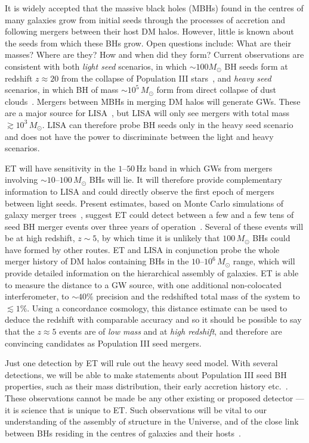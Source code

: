 It is widely accepted that the massive black holes (MBHs) found in the centres of many galaxies grow from initial seeds through the processes of accretion and following mergers between their host DM halos. However, little is known about the seeds from which these BHs grow. Open questions include: What are their masses? Where are they? How and when did they form? Current observations are consistent with both \emph{light seed} scenarios, in which $\sim100M_{\odot}$ BH seeds form at redshift $z \approx 20$ from the collapse of Population III stars~\cite{svh,madau01}, and \emph{heavy seed} scenarios, in which BH of mass $\sim10^5\,M_{\odot}$ form from direct collapse of dust clouds~\cite{KBD,BVR}. Mergers between MBHs in merging DM halos will generate GWs. These are a major source for LISA~\cite{PPA}, but LISA will only see mergers with total mass $\gtrsim 10^3\,M_{\odot}$. LISA can therefore probe BH seeds only in the heavy seed scenario and does not have the power to discriminate between the light and heavy scenarios.

ET will have sensitivity in the $1$--$50$\,Hz band
in which GWs from mergers involving
$\sim10$--$100\,M_{\odot}$ BHs will lie. It will therefore
provide complementary information to LISA and could directly observe
the first epoch of mergers between light seeds. Present estimates,
based on Monte Carlo simulations of galaxy merger
trees~\cite{vhm,vsh}, suggest ET could detect
between a few and a few tens of seed BH merger events over
three years of operation~\cite{sgmv09a}. Several of these events will
be at high redshift, $z\sim5$, by which time it is unlikely that
$100\,M_{\odot}$ BHs could have formed by other routes. ET and
LISA in conjunction probe the whole merger history of DM
halos containing BHs in the $10$--$10^6\,M_{\odot}$ range, which
will provide detailed information on the hierarchical assembly of
galaxies. ET is able to measure the distance to a GW source, with 
one additional non-colocated interferometer, to $\sim40\%$ precision 
and the redshifted total mass of the system to $\lesssim 1\%$.
Using a concordance cosmology, this distance estimate can be used 
to deduce the redshift with comparable accuracy and so it should be 
possible to say that the $z \approx 5$ events are of \emph{low mass} 
and at \emph{high redshift}, and therefore are convincing candidates 
as Population III seed mergers.

Just one detection by ET will rule out the heavy seed model. With several detections, we will be able to make statements about Population III seed BH properties, such as their mass distribution, their early accretion history etc.~\cite{sgmv09a}. These observations cannot be made be any other existing or proposed detector --- it is science that is unique to ET. Such observations will be vital to our understanding of the assembly of structure in the Universe, and of the close link between BHs residing in the centres of galaxies and their hosts~\cite{svh}.


